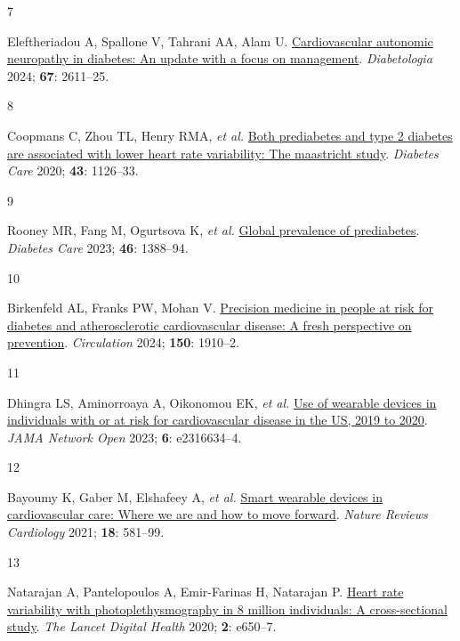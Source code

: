 \documentclass[
  a4paper,
  headsepline=true,
  open=left]{scrbook}
\newlength{\cslhangindent}
\newlength{\csllabelwidth}
\newlength{\cslentryspacingunit} %
\newenvironment{CSLReferences}[2] %
 {%
  \setlength{\parindent}{0pt}
  \ifodd #1
  \let\oldpar\par
  \def\par{\hangindent=\cslhangindent\oldpar}
  \fi
  \setlength{\parskip}{#2\cslentryspacingunit}
 }%
 {}
\newcommand{\CSLLeftMargin}[1]{\parbox[t]{\csllabelwidth}{#1}}
\newcommand{\CSLRightInline}[1]{\parbox[t]{\linewidth - \csllabelwidth}{#1}\break}
\begin{document}
\begin{CSLReferences}{0}{0}
\leavevmode{}%
\CSLLeftMargin{7 }%
\CSLRightInline{Eleftheriadou A, Spallone V, Tahrani AA, Alam U.
\href{https://doi.org/10.1007/s00125-024-06242-0}{Cardiovascular
autonomic neuropathy in diabetes: An update with a focus on management}.
\emph{Diabetologia} 2024; \textbf{67}: 2611--25.}

\leavevmode{}%
\CSLLeftMargin{8 }%
\CSLRightInline{Coopmans C, Zhou TL, Henry RMA, \emph{et al.}
\href{https://doi.org/10.2337/dc19-2367}{Both prediabetes and type 2
diabetes are associated with lower heart rate variability: The
maastricht study}. \emph{Diabetes Care} 2020; \textbf{43}: 1126--33.}

\leavevmode{}%
\CSLLeftMargin{9 }%
\CSLRightInline{Rooney MR, Fang M, Ogurtsova K, \emph{et al.}
\href{https://doi.org/10.2337/dc22-2376}{Global prevalence of
prediabetes}. \emph{Diabetes Care} 2023; \textbf{46}: 1388--94.}

\leavevmode{}%
\CSLLeftMargin{10 }%
\CSLRightInline{Birkenfeld AL, Franks PW, Mohan V.
\href{https://doi.org/10.1161/CIRCULATIONAHA.124.070463}{Precision
medicine in people at risk for diabetes and atherosclerotic
cardiovascular disease: A fresh perspective on prevention}.
\emph{Circulation} 2024; \textbf{150}: 1910--2.}

\leavevmode{}%
\CSLLeftMargin{11 }%
\CSLRightInline{Dhingra LS, Aminorroaya A, Oikonomou EK, \emph{et al.}
\href{https://doi.org/10.1001/jamanetworkopen.2023.16634}{Use of
wearable devices in individuals with or at risk for cardiovascular
disease in the US, 2019 to 2020}. \emph{JAMA Network Open} 2023;
\textbf{6}: e2316634--4.}

\leavevmode{}%
\CSLLeftMargin{12 }%
\CSLRightInline{Bayoumy K, Gaber M, Elshafeey A, \emph{et al.}
\href{https://doi.org/10.1038/s41569-021-00522-7}{Smart wearable devices
in cardiovascular care: Where we are and how to move forward}.
\emph{Nature Reviews Cardiology} 2021; \textbf{18}: 581--99.}

\leavevmode{}%
\CSLLeftMargin{13 }%
\CSLRightInline{Natarajan A, Pantelopoulos A, Emir-Farinas H, Natarajan
P. \href{https://doi.org/10.1016/S2589-7500(20)30246-6}{Heart rate
variability with photoplethysmography in 8 million individuals: A
cross-sectional study}. \emph{The Lancet Digital Health} 2020;
\textbf{2}: e650--7.}


\end{CSLReferences}
\end{document}
